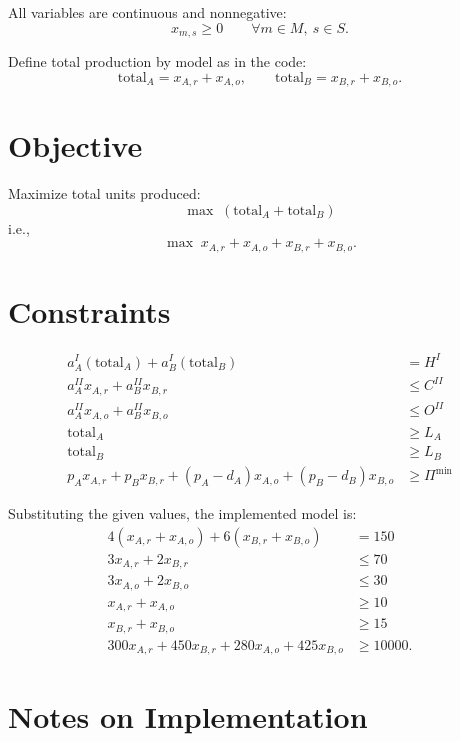 All variables are continuous and nonnegative:
\[
x_{m,s}\ge 0 \qquad \forall m\in M,\ s\in S.
\]

Define total production by model as in the code:
\[
\text{total}_A = x_{A,r}+x_{A,o},\qquad
\text{total}_B = x_{B,r}+x_{B,o}.
\]

\section*{Objective}

Maximize total units produced:
\[
\max \; (\text{total}_A+\text{total}_B)
\]
i.e.,
\[
\max \; x_{A,r}+x_{A,o}+x_{B,r}+x_{B,o}.
\]

\section*{Constraints}

\begin{align}
a^{I}_A(\text{total}_A) + a^{I}_B(\text{total}_B) &= H^{I}
\label{eq:proc1}
\\
a^{II}_A x_{A,r} + a^{II}_B x_{B,r} &\le C^{II}
\label{eq:proc2_regular}
\\
a^{II}_A x_{A,o} + a^{II}_B x_{B,o} &\le O^{II}
\label{eq:proc2_overtime}
\\
\text{total}_A &\ge L_A
\label{eq:minA}
\\
\text{total}_B &\ge L_B
\label{eq:minB}
\\
p_A x_{A,r} + p_B x_{B,r} + (p_A-d_A)x_{A,o} + (p_B-d_B)x_{B,o} &\ge \Pi^{\min}
\label{eq:profit_floor}
\end{align}

Substituting the given values, the implemented model is:
\begin{align}
4(x_{A,r}+x_{A,o}) + 6(x_{B,r}+x_{B,o}) &= 150
\\
3x_{A,r} + 2x_{B,r} &\le 70
\\
3x_{A,o} + 2x_{B,o} &\le 30
\\
x_{A,r}+x_{A,o} &\ge 10
\\
x_{B,r}+x_{B,o} &\ge 15
\\
300x_{A,r} + 450x_{B,r} + 280x_{A,o} + 425x_{B,o} &\ge 10000.
\end{align}

\section*{Notes on Implementation}

